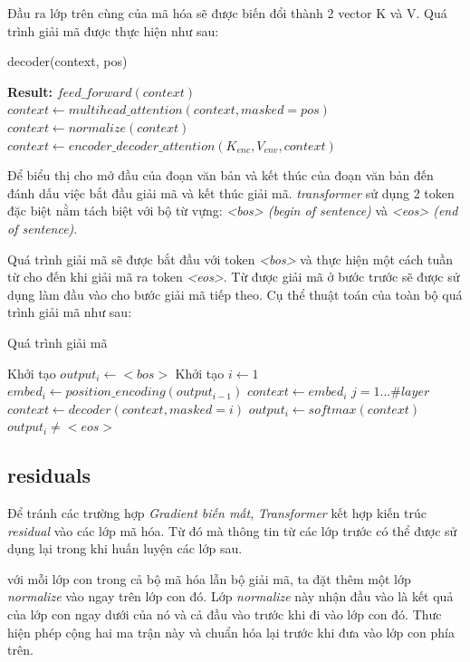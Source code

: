 Đầu ra lớp trên cùng của mã hóa sẽ được biến đổi thành 2 vector K và V. Quá trình giải mã được thực hiện như sau:


\begin{algorithm}[H]
    \caption{decoder(context, pos)}
    \begin{algorithmic}[1]
		\State \textbf{Result:} $feed\_forward(context)$
		\State $context \gets multihead\_attention(context, masked = pos)$
		\State $context \gets normalize(context)$
		\State $context \gets encoder\_decoder\_attention(K_{enc}, V_{env}, context)$
    \end{algorithmic}
\end{algorithm}

Để biểu thị cho mở đầu của đoạn văn bản và kết thúc của đoạn văn bản đến đánh dấu việc bắt đầu giải mã và kết thúc giải mã.  \textit{transformer}  sử dụng 2 token đặc biệt nằm tách biệt với bộ từ vựng: \textit{<bos> (begin of sentence)} và \textit{<eos> (end of sentence)}.

Quá trình giải mã sẽ được bắt đầu với token \textit{<bos>} và thực hiện một cách tuần từ cho đến khi giải mã ra token \textit{<eos>}. Từ được giải mã ở bước trước sẽ được sử dụng làm đầu vào cho bước giải mã tiếp theo. Cụ thể thuật toán của toàn bộ quá trình giải mã như sau:

\begin{algorithm}[H]
    \caption{Quá trình giải mã}
    \begin{algorithmic}[1]
		\State Khởi tạo $output_i \gets <bos>$
		\State Khởi tạo $i \gets 1$
		\Do
			\State $embed_i \gets position\_encoding(output_{i-1})$
			\State $context \gets embed_i$
			\For $j = 1...\#layer$
				\State $context \gets decoder(context, masked = i)$
			\EndFor
			\State $output_i \gets softmax(context)$
		\doWhile $output_i \neq <eos>$
    \end{algorithmic}
\end{algorithm}


\subsection{residuals}
Để tránh các trường hợp \textit{Gradient biến mất},  \textit{Transformer}  kết hợp kiến trúc \textit{residual} vào các lớp mã hóa. Từ đó mà thông tin từ các lớp trước có thể được sử dụng lại trong khi huấn luyện các lớp sau.

với mỗi lớp con trong cả bộ mã hóa lẫn bộ giải mã, ta đặt thêm một lớp \textit{normalize} vào ngay trên lớp con đó. Lớp \textit{normalize} này nhận đầu vào là kết quả của lớp con ngay dưới của nó và cả đầu vào trước khi đi vào lớp con đó. Thưc hiện phép cộng hai ma trận này và chuẩn hóa lại trước khi đưa vào lớp con phía trên.

